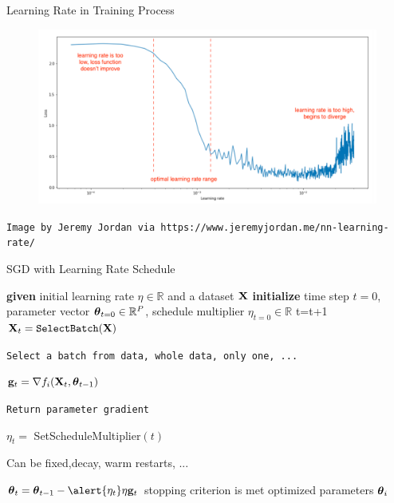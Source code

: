 \documentclass[xcolor=pdftex,dvipsnames,table,mathserif]{beamer}
\begin{document}
\begin{frame}{Learning Rate in Training Process}
\begin{figure}
\includegraphics[width=.95\columnwidth]{../graphics/LearningRateEffect}
\end{figure}
\texttt{Image by Jeremy Jordan via https://www.jeremyjordan.me/nn-learning-rate/}
\end{frame}

\begin{frame}{SGD with Learning Rate Schedule}
\begin{algorithm}[H]
\begin{algorithmic}[1]
\STATE \textbf{given} initial learning rate $\eta \in \mathbb{R}$ and a dataset $\mathbf{X}$
\STATE \textbf{initialize} time step $t=0$, parameter vector $\boldsymbol{\theta}_{t=0} \in \mathbb{R}^P$, schedule multiplier $\eta_{t=0} \in \mathbb{R}$
\REPEAT
\STATE t=t+1
\STATE $\mathbf{X}_t=\texttt{SelectBatch} (\mathbf{X})$ \begin{tiny}\texttt{Select a batch from data, whole data, only one, ... } \end{tiny}
\STATE $\mathbf{g}_t = \nabla f_i(\mathbf{X}_t,\boldsymbol{\theta}_{t-1})$  \begin{tiny}\texttt{Return parameter gradient}\end{tiny}
\STATE \alert{$\eta_t = $ SetScheduleMultiplier$(t)$} \begin{tiny}{Can be fixed,decay, warm restarts, ...}\end{tiny}
\STATE $\param_t=\param_{t-1}  - \alert{\eta_{t}} \eta \mathbf{g}_t$
\UNTIL stopping criterion is met
\RETURN optimized parameters $\boldsymbol{\theta}_i$
\end{algorithmic}
\caption{pseudocode for SGD with Learning Rate Schedule}
\label{alg:seq}
\end{algorithm}
\end{frame}
\end{document}
